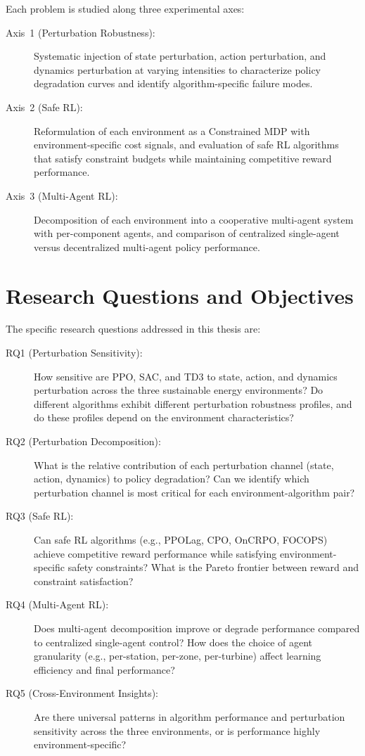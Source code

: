 Each problem is studied along three experimental axes:

\begin{description}
    \item[Axis~1 (Perturbation Robustness):] Systematic injection of state perturbation, action perturbation, and dynamics perturbation at varying intensities to characterize policy degradation curves and identify algorithm-specific failure modes.

    \item[Axis~2 (Safe RL):] Reformulation of each environment as a Constrained MDP with environment-specific cost signals, and evaluation of safe RL algorithms that satisfy constraint budgets while maintaining competitive reward performance.

    \item[Axis~3 (Multi-Agent RL):] Decomposition of each environment into a cooperative multi-agent system with per-component agents, and comparison of centralized single-agent versus decentralized multi-agent policy performance.
\end{description}

\section{Research Questions and Objectives}
\label{sec:research_questions}

The specific research questions addressed in this thesis are:

\begin{description}
    \item[RQ1 (Perturbation Sensitivity):] How sensitive are PPO, SAC, and TD3 to state, action, and dynamics perturbation across the three sustainable energy environments? Do different algorithms exhibit different perturbation robustness profiles, and do these profiles depend on the environment characteristics?

    \item[RQ2 (Perturbation Decomposition):] What is the relative contribution of each perturbation channel (state, action, dynamics) to policy degradation? Can we identify which perturbation channel is most critical for each environment-algorithm pair?

    \item[RQ3 (Safe RL):] Can safe RL algorithms (e.g., PPOLag, CPO, OnCRPO, FOCOPS) achieve competitive reward performance while satisfying environment-specific safety constraints? What is the Pareto frontier between reward and constraint satisfaction?

    \item[RQ4 (Multi-Agent RL):] Does multi-agent decomposition improve or degrade performance compared to centralized single-agent control? How does the choice of agent granularity (e.g., per-station, per-zone, per-turbine) affect learning efficiency and final performance?

    \item[RQ5 (Cross-Environment Insights):] Are there universal patterns in algorithm performance and perturbation sensitivity across the three environments, or is performance highly environment-specific?
\end{description}

